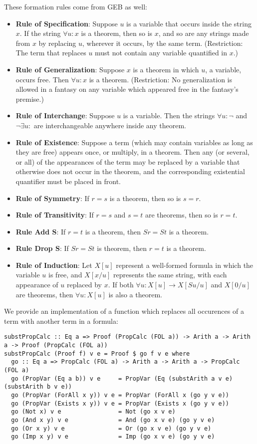 \documentclass{article}
\begin{document}
These formation rules come from GEB as well:

\begin{itemize}
\item \textbf{Rule of Specification}: Suppose $u$ is a variable that occurs inside the string $x$. If the string $\forall u:x$ is a theorem, then so is $x$, and so are any strings made from $x$ by replacing $u$, wherever it occurs, by the same term. (Restriction: The term that replaces $u$ must not contain any variable quantified in $x$.)
\item \textbf{Rule of Generalization}: Suppose $x$ is a theorem in which $u$, a variable, occurs free. Then $\forall u:x$ is a theorem. (Restriction: No generalization is allowed in a fantasy on any variable which appeared free in the fantasy's premise.)
\item \textbf{Rule of Interchange}: Suppose $u$ is a variable. Then the strings $\forall u:\neg$ and $\neg \exists u:$ are interchangeable anywhere inside any theorem.
\item \textbf{Rule of Existence}: Suppose a term (which may contain variables as long as they are free) appears once, or multiply, in a theorem. Then any (or several, or all) of the appearances of the term may be replaced by a variable that otherwise does not occur in the theorem, and the corresponding existential quantifier must be placed in front.
\item \textbf{Rule of Symmetry}: If $r=s$ is a theorem, then so is $s=r$.
\item \textbf{Rule of Transitivity}: If $r=s$ and $s=t$ are theorems, then so is $r=t$.
\item \textbf{Rule Add S}: If $r=t$ is a theorem, then $Sr=St$ is a theorem.
\item \textbf{Rule Drop S}: If $Sr=St$ is theorem, then $r=t$ is a theorem.
\item \textbf{Rule of Induction}: Let $X[u]$ represent a well-formed formula in which the variable $u$ is free, and $X[x/u]$ represents the same string, with each appearance of $u$ replaced by $x$. If both $\forall u:X[u] \to X[Su/u]$ and $X[0/u]$ are theorems, then $\forall u:X[u]$ is also a theorem.
\end{itemize}

We provide an implementation of a function which replaces all occurences of a term with another term in a formula:

\begin{lstlisting}
substPropCalc :: Eq a => Proof (PropCalc (FOL a)) -> Arith a -> Arith a -> Proof (PropCalc (FOL a))
substPropCalc (Proof f) v e = Proof $ go f v e where
  go :: Eq a => PropCalc (FOL a) -> Arith a -> Arith a -> PropCalc (FOL a)
  go (PropVar (Eq a b)) v e     = PropVar (Eq (substArith a v e) (substArith b v e))
  go (PropVar (ForAll x y)) v e = PropVar (ForAll x (go y v e))
  go (PropVar (Exists x y)) v e = PropVar (Exists x (go y v e))
  go (Not x) v e                = Not (go x v e)
  go (And x y) v e              = And (go x v e) (go y v e)
  go (Or x y) v e               = Or (go x v e) (go y v e)
  go (Imp x y) v e              = Imp (go x v e) (go y v e)
\end{lstlisting}
\end{document}
